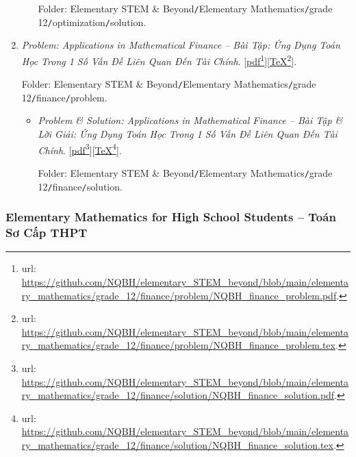 \documentclass[12pt,twoside]{book}
\begin{document}
\begin{enumerate}
\begin{itemize}
		Folder: {\sf Elementary STEM \& Beyond{\tt/}Elementary Mathematics{\tt/}grade 12{\tt/}optimization{\tt/}solution}.
	\end{itemize}
	\item {\it Problem: Applications in Mathematical Finance -- Bài Tập: Ứng Dụng Toán Học Trong 1 Số Vấn Đề Liên Quan Đến Tài Chính}. [\href{https://github.com/NQBH/elementary_STEM_beyond/blob/main/elementary_mathematics/grade_12/finance/problem/NQBH_finance_problem.pdf}{pdf}\footnote{{\sc url}: \url{https://github.com/NQBH/elementary_STEM_beyond/blob/main/elementary_mathematics/grade_12/finance/problem/NQBH_finance_problem.pdf}.}][\href{https://github.com/NQBH/elementary_STEM_beyond/blob/main/elementary_mathematics/grade_12/finance/problem/NQBH_finance_problem.tex}{\TeX}\footnote{{\sc url}: \url{https://github.com/NQBH/elementary_STEM_beyond/blob/main/elementary_mathematics/grade_12/finance/problem/NQBH_finance_problem.tex}.}].
	
	Folder: {\sf Elementary STEM \& Beyond{\tt/}Elementary Mathematics{\tt/}grade 12{\tt/}finance{\tt/}problem}.
	\begin{itemize}
		\item {\it Problem \& Solution: Applications in Mathematical Finance -- Bài Tập \& Lời Giải: Ứng Dụng Toán Học Trong 1 Số Vấn Đề Liên Quan Đến Tài Chính}. [\href{https://github.com/NQBH/elementary_STEM_beyond/blob/main/elementary_mathematics/grade_12/finance/solution/NQBH_finance_solution.pdf}{pdf}\footnote{{\sc url}: \url{https://github.com/NQBH/elementary_STEM_beyond/blob/main/elementary_mathematics/grade_12/finance/solution/NQBH_finance_solution.pdf}.}][\href{https://github.com/NQBH/elementary_STEM_beyond/blob/main/elementary_mathematics/grade_12/finance/solution/NQBH_finance_solution.tex}{\TeX}\footnote{{\sc url}: \url{https://github.com/NQBH/elementary_STEM_beyond/blob/main/elementary_mathematics/grade_12/finance/solution/NQBH_finance_solution.tex}.}].
		
		Folder: {\sf Elementary STEM \& Beyond{\tt/}Elementary Mathematics{\tt/}grade 12{\tt/}finance{\tt/}solution}.
	\end{itemize}
\end{enumerate}

\subsubsection{Elementary Mathematics for High School Students -- Toán Sơ Cấp THPT}
\end{document}
